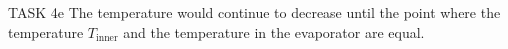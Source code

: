 TASK 4e  
The temperature would continue to decrease until the point where the temperature \( T_{\text{inner}} \) and the temperature in the evaporator are equal.